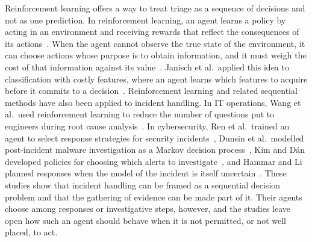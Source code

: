 \documentclass[12pt,a4paper]{article}
\begin{document}
Reinforcement learning offers a way to treat triage as a sequence of decisions and not as one prediction. In reinforcement learning, an agent learns a policy by acting in an environment and receiving rewards that reflect the consequences of its actions~\cite{sutton2018}. When the agent cannot observe the true state of the environment, it can choose actions whose purpose is to obtain information, and it must weigh the cost of that information against its value~\cite{kaelbling1998}. Janisch et al.\ applied this idea to classification with costly features, where an agent learns which features to acquire before it commits to a decision~\cite{janisch2019}. Reinforcement learning and related sequential methods have also been applied to incident handling. In IT operations, Wang et al.\ used reinforcement learning to reduce the number of questions put to engineers during root cause analysis~\cite{wang2023hrlhf}. In cybersecurity, Ren et al.\ trained an agent to select response strategies for security incidents~\cite{ren2025}, Dunsin et al.\ modelled post-incident malware investigation as a Markov decision process~\cite{dunsin2025}, Kim and D\'{a}n developed policies for choosing which alerts to investigate~\cite{kim2025}, and Hammar and Li planned responses when the model of the incident is itself uncertain~\cite{hammar2025}. These studies show that incident handling can be framed as a sequential decision problem and that the gathering of evidence can be made part of it. Their agents choose among responses or investigative steps, however, and the studies leave open how such an agent should behave when it is not permitted, or not well placed, to act.
\end{document}
